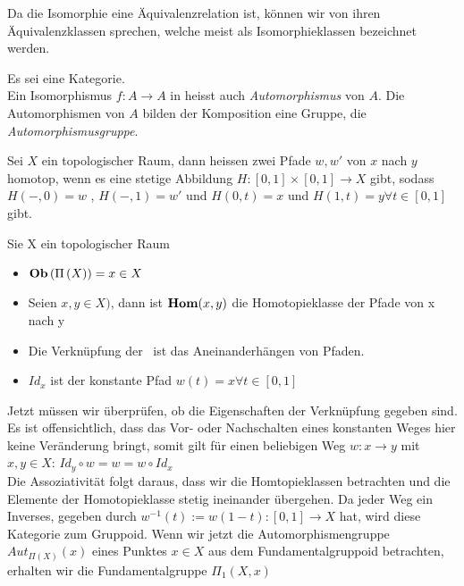 \documentclass{article}
\renewcommand{\id}{\ensuremath{Id}}
\begin{document}
		\begin{defi}[Isomorphieklassen]
			\cite[Definition 2.3.10]{Bra}
		 Da die Isomorphie eine \"Aquivalenzrelation ist, k\"onnen wir von ihren \"Aquivalenzklassen sprechen, welche meist als Isomorphieklassen bezeichnet werden.
		\end{defi}
		 
		 
		\begin{defi}[Automorphismengruppen]
		\cite[Definition 2.3.13]{Bra}
		 Es sei \CatC eine Kategorie.  \\
		 Ein Isomorphismus \( f:A \to A \) in \CatC heisst auch \emph{Automorphismus} von $A$. 
		 Die Automorphismen von $A$ bilden \bzgl der Komposition eine Gruppe, die \emph{Automorphismusgruppe}.
		\end{defi}
		
		\begin{defi}[Homotopieklasse]
			\cite[Aufgabe 2.24]{Bra}
		 	Sei \( X \) ein topologischer Raum, dann heissen zwei Pfade \( w,w'  \) von \(x \) nach \( y \) homotop, 
			wenn es eine stetige Abbildung \( H : [0,1] \times [0,1 ] \to X \) gibt, 
			sodass \( H(-,0) = w \) , \( H( -,1) =w' \) und \( H(0,t) =x \) und \(H(1,t) = y \forall t \in [0,1] \) gibt.
		\end{defi}
		 
		\begin{bsp}[Fundamentalgruppoid]
		 	\cite[Aufgabe 2.24 ]{Bra}
		 	Sie X ein topologischer Raum
		\begin{itemize}
			\item \( \mathbf{Ob}  \left( \Pi \left( X \right) \right) = x \in X \)
			\item Seien \( x ,y \in X ) \), dann ist \(  \mathbf{Hom } (x,y) \) die Homotopieklasse der Pfade von x nach y
			\item Die Verkn\"upfung der \Hom \ ist das Aneinanderh\"angen von Pfaden.
			\item \(  \id_x \) ist der konstante Pfad \( w(t)=x \forall t \in [0,1] \)
		\end{itemize}
		Jetzt m\"ussen wir \"uberpr\"ufen, ob die Eigenschaften der Verkn\"upfung gegeben sind.
		Es ist offensichtlich, dass das Vor- oder Nachschalten eines konstanten Weges hier keine Ver\"anderung bringt, somit gilt f\"ur einen beliebigen Weg 
		\(w:x \to y \) mit \( x,y \in X\):
		\( \id_y \circ w = w = w \circ \id_x \) \\
		Die Assoziativit\"at folgt daraus, dass wir die Homtopieklassen betrachten und die Elemente der Homotopieklasse stetig ineinander \"ubergehen.
		Da jeder Weg ein Inverses, gegeben durch \( w^{-1}(t):=w(1-t): [0,1] \to X \) hat, wird diese Kategorie zum Gruppoid.
		Wenn wir jetzt die Automorphismengruppe \( Aut_{\Pi(X)}(x) \) eines Punktes \(x \in X \) aus dem Fundamentalgruppoid betrachten, erhalten wir die Fundamentalgruppe \( \Pi_1(X,x) \) \cite[Beispiel 2.3.14-(8)]{Bra}
		\end{bsp}
	
\end{document}
